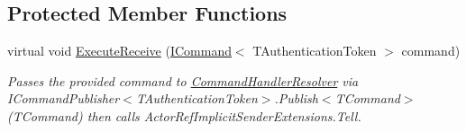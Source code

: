 \subsection*{Protected Member Functions}
\begin{DoxyCompactItemize}
\item 
virtual void \hyperlink{classCqrs_1_1Akka_1_1Commands_1_1AkkaCommandBusProxy_1_1BusActor_a2218f176012e4074308d8de36f1f48a2_a2218f176012e4074308d8de36f1f48a2}{Execute\+Receive} (\hyperlink{interfaceCqrs_1_1Commands_1_1ICommand}{I\+Command}$<$ T\+Authentication\+Token $>$ command)
\begin{DoxyCompactList}\small\item\em Passes the provided {\itshape command}  to \hyperlink{classCqrs_1_1Akka_1_1Commands_1_1AkkaCommandBusProxy_1_1BusActor_a097e43f25d55e632c2c5da9d0255d180_a097e43f25d55e632c2c5da9d0255d180}{Command\+Handler\+Resolver} via I\+Command\+Publisher$<$\+T\+Authentication\+Token$>$.\+Publish$<$\+T\+Command$>$(\+T\+Command) then calls Actor\+Ref\+Implicit\+Sender\+Extensions.\+Tell. \end{DoxyCompactList}\end{DoxyCompactItemize}
